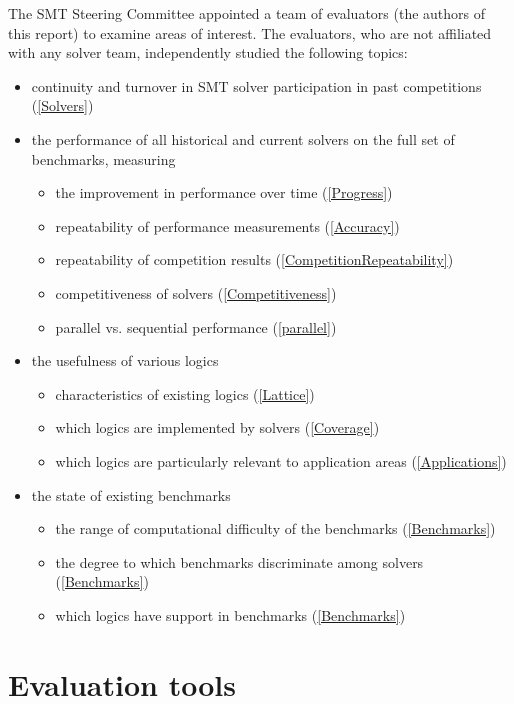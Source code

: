 \documentclass[smallcondensed]{svjour3}
\begin{document}
The SMT Steering Committee appointed a team of evaluators (the authors
of this report) to examine areas of interest. The evaluators, who are
not affiliated with any solver team, independently studied the
following topics:
\begin{itemize}[noitemsep]
\item continuity and turnover in SMT solver participation in past competitions (\ref{Solvers})
\item the performance of all historical and current solvers on the full set of benchmarks, measuring
\begin{itemize}[noitemsep]
\item the improvement in performance over time (\ref{Progress})
\item repeatability of performance measurements (\ref{Accuracy})
\item repeatability of competition results (\ref{CompetitionRepeatability})
\item competitiveness of solvers (\ref{Competitiveness})
\item parallel vs. sequential performance (\ref{parallel})
\end{itemize}
\item the usefulness of various logics
\begin{itemize}[noitemsep]
\item characteristics of existing logics (\ref{Lattice})
\item which logics are implemented by solvers (\ref{Coverage})
\item which logics are particularly relevant to application areas (\ref{Applications})
\end{itemize}
\item the state of existing benchmarks
\begin{itemize}[noitemsep]
\item the range of computational difficulty of the benchmarks (\ref{Benchmarks})
\item the degree to which benchmarks discriminate among solvers (\ref{Benchmarks})
\item which logics have support in benchmarks (\ref{Benchmarks})
\end{itemize}
\end{itemize}


\section{Evaluation tools}
\end{document}
